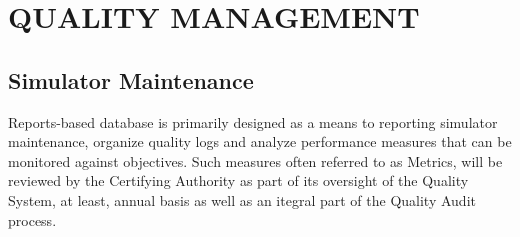 \chapter{QUALITY MANAGEMENT}

\renewcommand{\headrulewidth}{0.5pt}
\renewcommand{\footrulewidth}{0.5pt}
\thispagestyle{plain}
\pagestyle{fancy}
\fancyhf{}
\raggedright
{}

\justifying

\section{Simulator Maintenance}
    Reports-based database is primarily designed as a means to reporting simulator maintenance, organize quality logs and analyze 
    performance measures that can be monitored against objectives. Such measures often referred to as Metrics, will be reviewed by 
    the Certifying Authority as part of its oversight of the Quality System, at least, annual basis as well as an itegral part of 
    the Quality Audit process.
